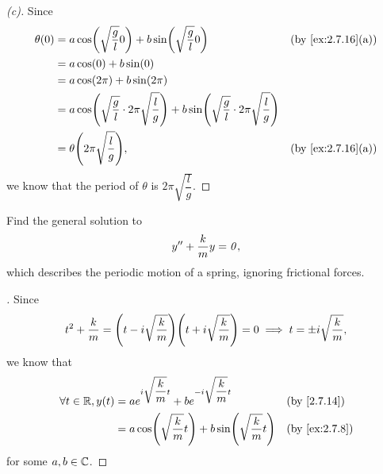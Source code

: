 \begin{proof}[(c)]
  Since
  \begin{align*}
    \theta(0) & = a \cos\pa{\sqrt{\dfrac{g}{l}} 0} + b \sin\pa{\sqrt{\dfrac{g}{l}} 0}                                                              &  & \by{ex:2.7.16}[a] \\
              & = a \cos(0) + b \sin(0)                                                                                                                                   \\
              & = a \cos(2 \pi) + b \sin(2 \pi)                                                                                                                           \\
              & = a \cos\pa{\sqrt{\dfrac{g}{l}} \cdot 2 \pi \sqrt{\dfrac{l}{g}}} + b \sin\pa{\sqrt{\dfrac{g}{l}}  \cdot 2 \pi \sqrt{\dfrac{l}{g}}}                        \\
              & = \theta\pa{2 \pi \sqrt{\dfrac{l}{g}}},                                                                                            &  & \by{ex:2.7.16}[a]
  \end{align*}
  we know that the period of \(\theta\) is \(2 \pi \sqrt{\dfrac{l}{g}}\).
\end{proof}

\begin{ex}\label{ex:2.7.17}
  Find the general solution to
  \[
    y'' + \dfrac{k}{m} y = \mathit{0},
  \]
  which describes the periodic motion of a spring, ignoring frictional forces.
\end{ex}

\begin{proof}[]
  Since
  \[
    t^2 + \dfrac{k}{m} = \pa{t - i \sqrt{\dfrac{k}{m}}} \pa{t + i \sqrt{\dfrac{k}{m}}} = 0 \implies t = \pm i \sqrt{\dfrac{k}{m}},
  \]
  we know that
  \begin{align*}
    \forall t \in \R, y(t) & = a e^{i \sqrt{\dfrac{k}{m}} t} + b e^{-i \sqrt{\dfrac{k}{m}} t}      &  & \by{2.7.14}   \\
                           & = a \cos\pa{\sqrt{\dfrac{k}{m}} t} + b \sin\pa{\sqrt{\dfrac{k}{m}} t} &  & \by{ex:2.7.8}
  \end{align*}
  for some \(a, b \in \mathbb{C}\).
\end{proof}

